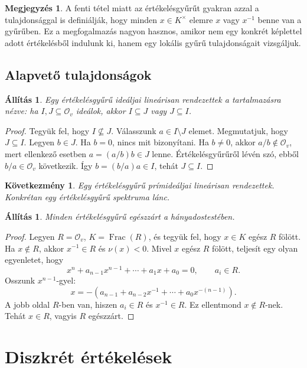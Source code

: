 \documentclass[11pt,a4paper]{article}
\newtheorem{allitas}[tetel]{Állítás}
\newtheorem{kovetkezmeny}[tetel]{Következmény}
\theoremstyle{definition}
\newtheorem{megjegyzes}[tetel]{Megjegyzés}
\DeclareMathOperator{\Frac}{Frac}
\newcommand{\OO}{\mathcal O}
\begin{document}
\begin{megjegyzes}
A fenti tétel miatt az értékelésgyűrűt gyakran azzal a
tulajdonsággal is definiálják, hogy minden $x\in K^\times$ elemre
$x$ vagy $x^{-1}$ benne van a gyűrűben. Ez a megfogalmazás nagyon
hasznos, amikor nem egy konkrét képlettel adott értékelésből indulunk
ki, hanem egy lokális gyűrű tulajdonságait vizsgáljuk.
\end{megjegyzes}

\subsection{Alapvető tulajdonságok}

\begin{allitas}
Egy értékelésgyűrű ideáljai lineárisan rendezettek a tartalmazásra
nézve: ha $I,J\subseteq\OO_v$ ideálok, akkor $I\subseteq J$ vagy
$J\subseteq I$.
\end{allitas}

\begin{proof}
Tegyük fel, hogy $I\not\subseteq J$. Válasszunk $a\in I\setminus J$
elemet. Megmutatjuk, hogy $J\subseteq I$. Legyen $b\in J$. Ha
$b=0$, nincs mit bizonyítani. Ha $b\neq 0$, akkor $a/b\notin\OO_v$,
mert ellenkező esetben $a=(a/b)b\in J$ lenne. Értékelésgyűrűről
lévén szó, ebből $b/a\in\OO_v$ következik. Így
$b=(b/a)a\in I$, tehát $J\subseteq I$.
\end{proof}

\begin{kovetkezmeny}
Egy értékelésgyűrű prímideáljai lineárisan rendezettek. Konkrétan
egy értékelésgyűrű spektruma lánc.
\end{kovetkezmeny}

\begin{allitas}
Minden értékelésgyűrű egészzárt a hányadostestében.
\end{allitas}

\begin{proof}
Legyen $R=\OO_v$, $K=\Frac(R)$, és tegyük fel, hogy
$x\in K$ egész $R$ fölött. Ha $x\notin R$, akkor
$x^{-1}\in R$ és $
\nu(x)<0$. Mivel $x$ egész $R$ fölött, teljesít egy
olyan egyenletet, hogy
\[
  x^n+a_{n-1}x^{n-1}+\cdots+a_1x+a_0=0,
  \qquad a_i\in R.
\]
Osszunk $x^{n-1}$-gyel:
\[
  x=-(a_{n-1}+a_{n-2}x^{-1}+\cdots+a_0x^{-(n-1)}).
\]
A jobb oldal $R$-ben van, hiszen $a_i\in R$ és $x^{-1}\in R$. Ez
ellentmond $x\notin R$-nek. Tehát $x\in R$, vagyis $R$ egészzárt.
\end{proof}

\section{Diszkrét értékelések}
\end{document}
